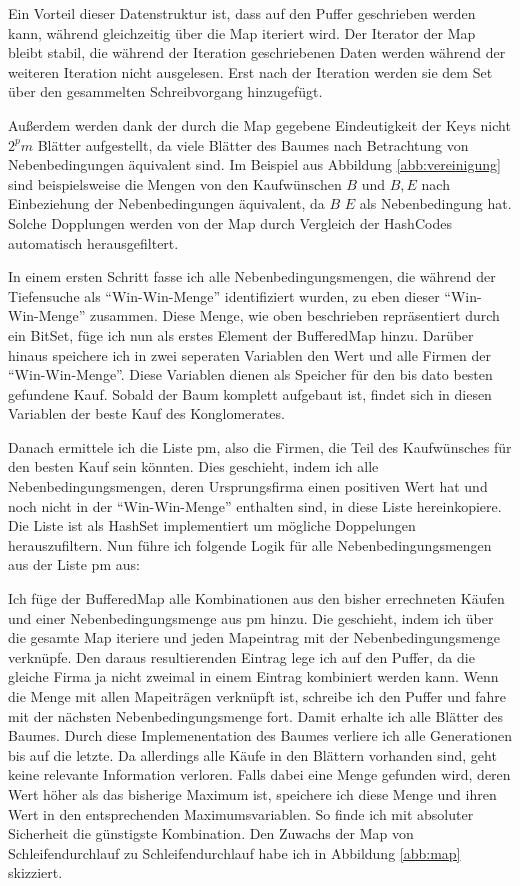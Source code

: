 Ein Vorteil dieser Datenstruktur ist, dass auf den Puffer geschrieben werden kann, während gleichzeitig über die Map iteriert wird. Der Iterator der Map bleibt stabil, die während der Iteration geschriebenen Daten werden während der weiteren Iteration nicht ausgelesen. Erst nach der Iteration werden sie dem Set über den gesammelten Schreibvorgang hinzugefügt.

Außerdem werden dank der durch die Map gegebene Eindeutigkeit der Keys nicht \(2^pm\) Blätter aufgestellt, da viele Blätter des Baumes nach Betrachtung von Nebenbedingungen äquivalent sind. Im Beispiel aus Abbildung \ref{abb:vereinigung} sind beispielsweise die Mengen von den Kaufwünschen \(B\) und \(B, E\) nach Einbeziehung der Nebenbedingungen äquivalent, da \(B\) \(E\) als Nebenbedingung hat. Solche Dopplungen werden von der Map durch Vergleich der HashCodes automatisch herausgefiltert.

In einem ersten Schritt fasse ich alle Nebenbedingungsmengen, die während der Tiefensuche als "`Win-Win-Menge"' identifiziert wurden, zu eben dieser "`Win-Win-Menge"' zusammen. Diese Menge, wie oben beschrieben repräsentiert durch ein BitSet, füge ich nun als erstes Element der BufferedMap hinzu.
Darüber hinaus speichere ich in zwei seperaten Variablen den Wert und alle Firmen der "`Win-Win-Menge"'. Diese Variablen dienen als Speicher für den bis dato besten gefundene Kauf. Sobald der Baum komplett aufgebaut ist, findet sich in diesen Variablen der beste Kauf des Konglomerates.

Danach ermittele ich die Liste pm, also die Firmen, die Teil des Kaufwünsches für den besten Kauf sein könnten. Dies geschieht, indem ich alle Nebenbedingungsmengen, deren Ursprungsfirma einen positiven Wert hat und noch nicht in der "`Win-Win-Menge"' enthalten sind, in diese Liste hereinkopiere. Die Liste ist als HashSet implementiert um mögliche Doppelungen herauszufiltern. Nun führe ich folgende Logik für alle Nebenbedingungsmengen aus der Liste pm aus:

Ich füge der BufferedMap alle Kombinationen aus den bisher errechneten Käufen und einer Nebenbedingungsmenge aus pm hinzu. Die geschieht, indem ich über die gesamte Map iteriere und jeden Mapeintrag mit der Nebenbedingungsmenge verknüpfe. Den daraus resultierenden Eintrag lege ich auf den Puffer, da die gleiche Firma ja nicht zweimal in einem Eintrag kombiniert werden kann. Wenn die Menge mit allen Mapeiträgen verknüpft ist, schreibe ich den Puffer und fahre mit der nächsten Nebenbedingungsmenge fort. Damit erhalte ich alle Blätter des Baumes. Durch diese Implemenentation des Baumes verliere ich alle Generationen bis auf die letzte. Da allerdings alle Käufe in den Blättern vorhanden sind, geht keine relevante Information verloren. Falls dabei eine Menge gefunden wird, deren Wert höher als das bisherige Maximum ist, speichere ich diese Menge und ihren Wert in den entsprechenden Maximumsvariablen. So finde ich mit absoluter Sicherheit die günstigste Kombination. Den Zuwachs der Map von Schleifendurchlauf zu Schleifendurchlauf habe ich in Abbildung \ref{abb:map} skizziert.

